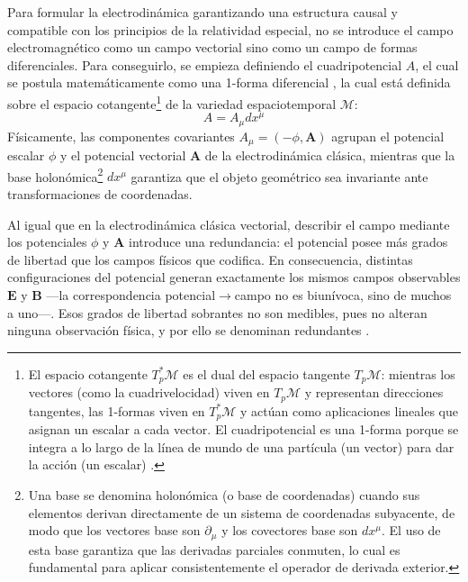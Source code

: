 \primerparrafo Para formular la electrodinámica garantizando una estructura causal y compatible con los principios de la relatividad especial, no se introduce el campo electromagnético como un campo vectorial sino como un campo de formas diferenciales. Para conseguirlo, se empieza definiendo el cuadripotencial $A$, el cual se postula matemáticamente como una 1-forma diferencial \parencite{schutz2009, misner1973, baez-muniain-1994, vargas-2014}, la cual está definida sobre el espacio cotangente\footnote{El espacio cotangente $T^*_p\mathcal{M}$ es el dual del espacio tangente $T_p\mathcal{M}$: mientras los vectores (como la cuadrivelocidad) viven en $T_p\mathcal{M}$ y representan direcciones tangentes, las 1-formas viven en $T^*_p\mathcal{M}$ y actúan como aplicaciones lineales que asignan un escalar a cada vector. El cuadripotencial es una 1-forma porque se integra a lo largo de la línea de mundo de una partícula (un vector) para dar la acción (un escalar) \parencite{nakahara-2003, baez-muniain-1994}.} de la variedad espaciotemporal $\mathcal{M}$:
\begin{equation}
    A = A_\mu dx^\mu
\end{equation}
Físicamente, las componentes covariantes $A_\mu = (-\phi, \mathbf{A})$ agrupan el potencial escalar $\phi$ y el potencial vectorial $\mathbf{A}$ de la electrodinámica clásica, mientras que la base holonómica\footnote{Una base se denomina holonómica (o base de coordenadas) cuando sus elementos derivan directamente de un sistema de coordenadas subyacente, de modo que los vectores base son $\partial_\mu$ y los covectores base son $dx^\mu$. El uso de esta base garantiza que las derivadas parciales conmuten, lo cual es fundamental para aplicar consistentemente el operador de derivada exterior.} $dx^\mu$ garantiza que el objeto geométrico sea invariante ante transformaciones de coordenadas.

Al igual que en la electrodinámica clásica vectorial, describir el campo mediante los potenciales $\phi$ y $\mathbf{A}$ introduce una redundancia: el potencial posee más grados de libertad que los campos físicos que codifica. En consecuencia, distintas configuraciones del potencial generan exactamente los mismos campos observables $\mathbf{E}$ y $\mathbf{B}$ ---la correspondencia potencial$\to$campo no es biunívoca, sino de muchos a uno---. Esos grados de libertad sobrantes no son medibles, pues no alteran ninguna observación física, y por ello se denominan redundantes \parencite{baez-muniain-1994}. 

